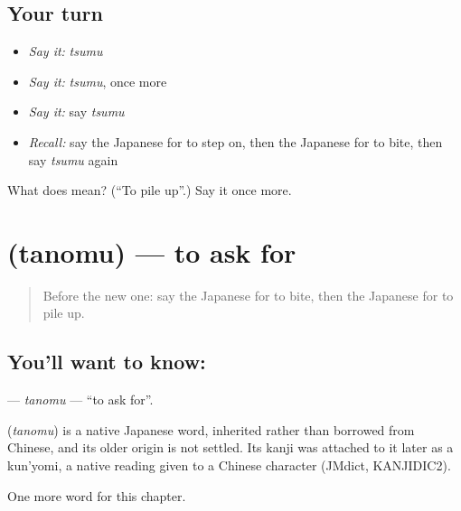 \subsection*{Your turn}
\begin{itemize}
\raggedright
  \item \emph{Say it:} \emph{tsumu}
  \item \emph{Say it:} \emph{tsumu}, once more
  \item \emph{Say it:} say \emph{tsumu}
  \item \emph{Recall:} say the Japanese for to step on, then the Japanese for to bite, then say \emph{tsumu} again
\end{itemize}

\begin{tcolorbox}[breakable,colback=teal!4,colframe=teal!35!black,title={Before you move on}]
What does  mean? (\textquotedblleft{}To pile up\textquotedblright{}.) Say it once more.
\end{tcolorbox}
\section[\texorpdfstring{\ja{たのむ} (tanomu)}{たのむ (tanomu)}]{ (tanomu) — to ask for}

\label{lesson:JA-C87-tanomu}



\begin{quote}
Before the new one: say the Japanese for to bite, then the Japanese for to pile up.
\end{quote}

\subsection*{You'll want to know: }
\textbf{} — \emph{tanomu} — \textquotedblleft{}to ask for\textquotedblright{}.

\begin{cousinweb}
\textbf{} (\emph{tanomu}) is a native Japanese word, inherited rather than borrowed from Chinese, and its older origin is not settled. Its kanji was attached to it later as a kun'yomi, a native reading given to a Chinese character (JMdict, KANJIDIC2).
\end{cousinweb}

\begin{grammarlens}[title={What you've built}]
One more word for this chapter.
\end{grammarlens}

